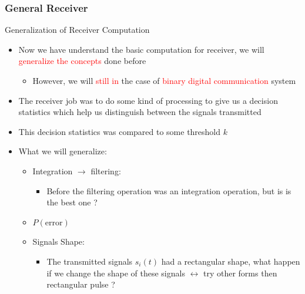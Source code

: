 \documentclass{Beamer}
\begin{document}
\subsubsection{General Receiver}


\begin{frame}[t]{Generalization of Receiver Computation}

\begin{itemize}

\item Now we have understand the basic computation for receiver,
we will \textcolor{red}{generalize the concepts} done before

	\begin{itemize}
	\item However, we will \textcolor{red}{still in} the case of \textcolor{red}{binary digital communication} system 
	\end{itemize}

\item The receiver job was to do some kind of processing to give us a decision statistics which help us distinguish between the signals transmitted

\item  This decision statistics was compared to some threshold $k$

\item What we will generalize:

	\begin{itemize}
	\item Integration $\rightarrow$ filtering:
	
		\begin{itemize}
		\item Before the filtering operation was an integration operation, but is is the best one ?
		\end{itemize}

	\item $P(\text{error})$	
	
	\item Signals Shape:
	
		\begin{itemize}
		\item The transmitted signals $s_i(t)$ had a rectangular shape, what happen if we change the shape of these signals $\leftrightarrow$ try other forms then rectangular pulse ?
\end{itemize}			
	
	\end{itemize}


\end{itemize}

\end{frame}
\end{document}
